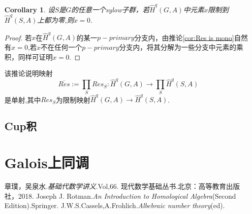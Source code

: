 \documentclass[UTF8]{article}
\newtheorem{cor}{Corollary}[section]
\begin{document}
\begin{cor}
	设$S$是$G$的任意一个sylow子群，若$\widehat{H}^{q}(G,A)$中元素$x$限制到$\widehat{H}^{q}(S,A)$上都为零,则$x=0$.
\end{cor}
\begin{proof}
	若$x$在$\widehat{H}^{q}(G,A)$的某一$p-primary$分支内，由推论\ref{cor:Res is mono}自然有$x=0$,若$x$不在任何一个$p-primary$分支内，将其分解为一些分支中元素的乘积，同样可证明$x=0$.
\end{proof}
	该推论说明映射
	$$
	\overline{Res}:=\prod_{S}Res_{S}:\widehat{H}^{q}(G,A)\rightarrow \prod_{S}\widehat{H}^{q}(S,A)
	$$
	是单射,其中$Res_{S}$为限制映射$\widehat{H}^{q}(G,A)\rightarrow \widehat{H}^{q}(S,A)$.


\subsection{Cup积}



\section{Galois上同调}


		\begin{thebibliography}{99}
			 章璞，吴泉水.\emph{基础代数学讲义}.Vol,66.
			现代数学基础丛书.北京：高等教育出版社，2018.
			Joseph J. Rotman.\emph{An Introduction to
				Homological Algebra}(Second Edition).Springer.
			J.W.S.Cassels,A.Frohlich.\emph{Albebraic number theory}(ed).
		\end{thebibliography}
	
\end{document}

